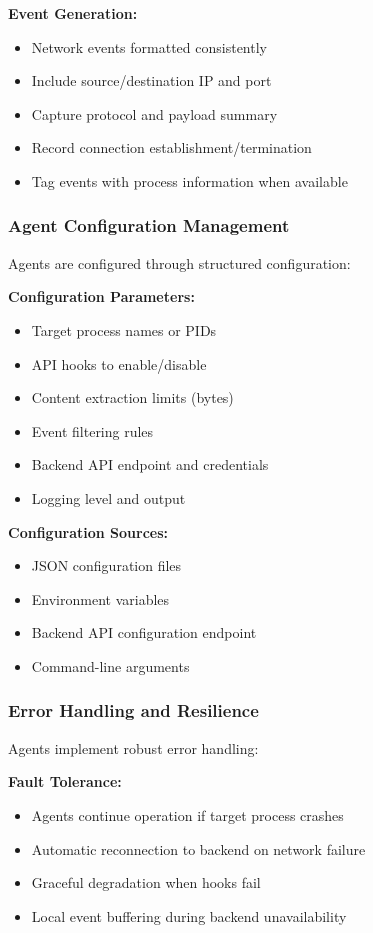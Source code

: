 \textbf{Event Generation:}
\begin{itemize}
    \item Network events formatted consistently
    \item Include source/destination IP and port
    \item Capture protocol and payload summary
    \item Record connection establishment/termination
    \item Tag events with process information when available
\end{itemize}

\subsubsection{Agent Configuration Management}

Agents are configured through structured configuration:

\textbf{Configuration Parameters:}
\begin{itemize}
    \item Target process names or PIDs
    \item API hooks to enable/disable
    \item Content extraction limits (bytes)
    \item Event filtering rules
    \item Backend API endpoint and credentials
    \item Logging level and output
\end{itemize}

\textbf{Configuration Sources:}
\begin{itemize}
    \item JSON configuration files
    \item Environment variables
    \item Backend API configuration endpoint
    \item Command-line arguments
\end{itemize}

\subsubsection{Error Handling and Resilience}

Agents implement robust error handling:

\textbf{Fault Tolerance:}
\begin{itemize}
    \item Agents continue operation if target process crashes
    \item Automatic reconnection to backend on network failure
    \item Graceful degradation when hooks fail
    \item Local event buffering during backend unavailability
\end{itemize}

